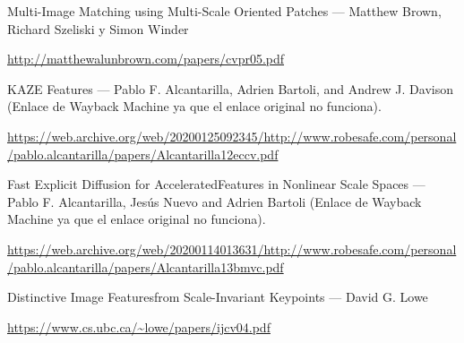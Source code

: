 \documentclass[12pt, spanish]{article}
\begin{document}
\begin{thebibliography}{9}


		Multi-Image Matching using Multi-Scale Oriented Patches --- Matthew Brown, Richard Szeliski y Simon Winder

		\url{http://matthewalunbrown.com/papers/cvpr05.pdf}


		KAZE Features --- Pablo F. Alcantarilla, Adrien Bartoli, and Andrew J. Davison (Enlace de Wayback Machine ya que el enlace original no funciona).

		\url{https://web.archive.org/web/20200125092345/http://www.robesafe.com/personal/pablo.alcantarilla/papers/Alcantarilla12eccv.pdf}


		Fast Explicit Diffusion for AcceleratedFeatures in Nonlinear Scale Spaces --- Pablo F. Alcantarilla, Jesús Nuevo and Adrien Bartoli (Enlace de Wayback Machine ya que el enlace original no funciona).

		\url{https://web.archive.org/web/20200114013631/http://www.robesafe.com/personal/pablo.alcantarilla/papers/Alcantarilla13bmvc.pdf}



		Distinctive Image Featuresfrom Scale-Invariant Keypoints --- David G. Lowe

		\url{https://www.cs.ubc.ca/~lowe/papers/ijcv04.pdf}


\end{thebibliography}
\end{document}
